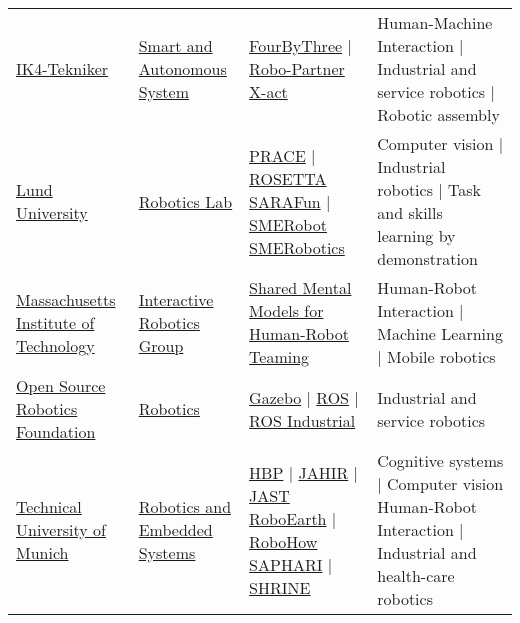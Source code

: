 \begin{table}[H]
\begin{tabu} { X[m,c] X[0.9,m,c] X[1.2,m,c] X[1.8,m,c] }
		\tabucline[1pt on 1.5pt off 3pt]{-}
		\href{http://www.tekniker.es/en}{IK4-Tekniker} &
		\href{http://www.tekniker.es/en/automation-and-industrial-robotics}{Smart and Autonomous System} &
		\href{http://fourbythree.eu/}{FourByThree} | \href{http://www.robo-partner.eu}{Robo-Partner} \href{http://www.xact-project.eu}{X-act} &
		Human-Machine Interaction | Industrial and service robotics | Robotic assembly \\

		\tabucline[1pt on 1.5pt off 3pt]{-}
		\href{http://www.lunduniversity.lu.se/}{Lund University} &
		\href{http://www.control.lth.se/Research/Robotics.html}{Robotics Lab} &
		\href{http://www.control.lth.se/Research/Robotics/prace-project.html}{PRACE} | \href{http://www.fp7rosetta.org}{ROSETTA} \href{http://h2020sarafun.eu}{SARAFun} | \href{http://www.smerobot.org}{SMERobot} \href{http://www.smerobotics.org/AUTOMATICA/exhibit-09-2016.html}{SMERobotics} &
		Computer vision | Industrial robotics | Task and skills learning by demonstration \\

		\tabucline[1pt on 1.5pt off 3pt]{-}
		\href{http://web.mit.edu/}{Massachusetts Institute of Technology} &
		\href{https://interactive.mit.edu/about/vision}{Interactive Robotics Group} &
		\href{https://interactive.mit.edu/research}{Shared Mental Models for Human-Robot Teaming} &
		Human-Robot Interaction | Machine Learning | Mobile robotics \\

		\tabucline[1pt on 1.5pt off 3pt]{-}
		\href{http://www.osrfoundation.org}{Open Source Robotics Foundation} &
		\href{http://www.osrfoundation.org/osrf-projects/}{Robotics} &
		\href{http://gazebosim.org/}{Gazebo} | \href{http://www.ros.org/}{ROS} | \href{http://rosindustrial.org/}{ROS Industrial} &
		Industrial and service robotics \\

		\tabucline[1pt on 1.5pt off 3pt]{-}
		\href{http://www.tum.de/en}{Technical University of Munich} &
		\href{http://www6.in.tum.de/Main/Research}{Robotics and Embedded Systems} &
		\href{https://www.humanbrainproject.eu/}{HBP} | \href{http://www6.in.tum.de/Main/ResearchJahir}{JAHIR} | \href{http://www6.in.tum.de/Main/ResearchJast}{JAST} \href{http://roboearth.org/}{RoboEarth} | \href{https://robohow.eu}{RoboHow} \href{http://www.saphari.eu}{SAPHARI} | \href{http://www.shrine-project.eu}{SHRINE} &
		Cognitive systems | Computer vision Human-Robot Interaction | Industrial and health-care robotics \\


\end{tabu}
\end{table}

